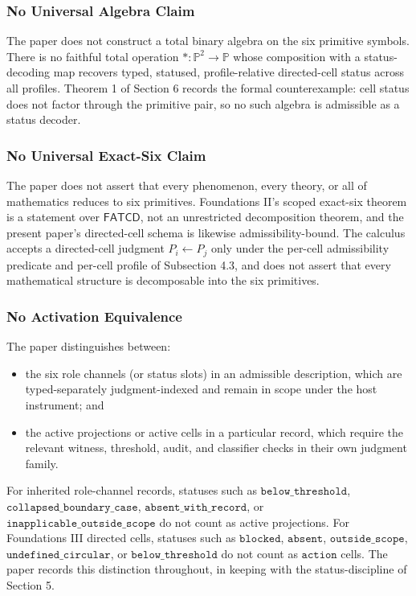 \documentclass[11pt]{article}
\providecommand{\tightlist}{}
\theoremstyle{definition}
\begin{document}
\subsubsection{No Universal Algebra Claim}

The paper does not construct a total binary algebra on the six primitive symbols. There is no faithful total operation \(\ast:\mathbb P^{2}\to\mathbb P\) whose composition with a status-decoding map recovers typed, statused, profile-relative directed-cell status across all profiles. Theorem 1 of Section 6 records the formal counterexample: cell status does not factor through the primitive pair, so no such algebra is admissible as a status decoder.

\subsubsection{No Universal Exact-Six Claim}

The paper does not assert that every phenomenon, every theory, or all of mathematics reduces to six primitives. Foundations II's scoped exact-six theorem is a statement over \(\mathsf{FATCD}\), not an unrestricted decomposition theorem, and the present paper's directed-cell schema is likewise admissibility-bound. The calculus accepts a directed-cell judgment \(P_{i}\leftarrow P_{j}\) only under the per-cell admissibility predicate and per-cell profile of Subsection 4.3, and does not assert that every mathematical structure is decomposable into the six primitives.

\subsubsection{No Activation Equivalence}

The paper distinguishes between:

\begin{itemize}
\tightlist
\item
  the six role channels (or status slots) in an admissible description, which are typed-separately judgment-indexed and remain in scope under the host instrument; and
\item
  the active projections or active cells in a particular record, which require the relevant witness, threshold, audit, and classifier checks in their own judgment family.
\end{itemize}

For inherited role-channel records, statuses such as \(\texttt{below\_threshold}\), \(\texttt{collapsed\_boundary\_case}\), \(\texttt{absent\_with\_record}\), or \(\texttt{inapplicable\_outside\_scope}\) do not count as active projections. For Foundations III directed cells, statuses such as \(\texttt{blocked}\), \(\texttt{absent}\), \(\texttt{outside\_scope}\), \(\texttt{undefined\_circular}\), or \(\texttt{below\_threshold}\) do not count as \(\texttt{action}\) cells. The paper records this distinction throughout, in keeping with the status-discipline of Section 5.
\end{document}
